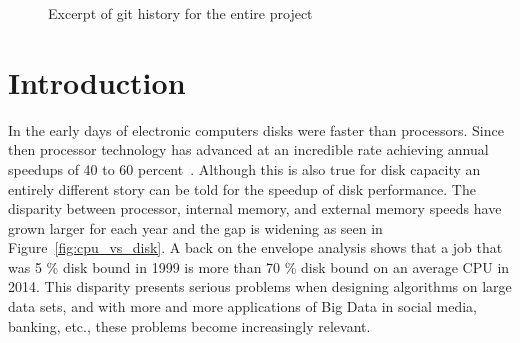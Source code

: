 \documentclass[twoside,11pt,openright]{report}
\newcommand\commit[3]{\node[commit] (#1) {}; \node[clabel] at (#1) {\texttt{#1}: (\textit{#2}) #3};}
\newcommand\connect[2]{\path (#1) to[out=90,in=-90] (#2);}
\begin{document}
\begin{figure}
\caption{Excerpt of git history for the entire project}
\label{fig:git_history}
\end{figure}

\setcounter{secnumdepth}{2}

\chapter{Introduction}
\label{chp:introduction}

In the early days of electronic computers disks were faster than processors. Since then processor technology has advanced at an incredible rate achieving annual speedups of 40 to 60 percent~\cite{ruemmler_wilkes_1994}. Although this is also true for disk capacity an entirely different story can be told for the speedup of disk performance. The disparity between processor, internal memory, and external memory speeds have grown larger for each year and the gap is widening as seen in Figure~\ref{fig:cpu_vs_disk}. A back on the envelope analysis shows that a job that was 5 \% disk bound in 1999 is more than 70 \% disk bound on an average CPU in 2014. This disparity presents serious problems when designing algorithms on large data sets, and with more and more applications of Big Data in social media, banking, etc., these problems become increasingly relevant.
\end{document}
